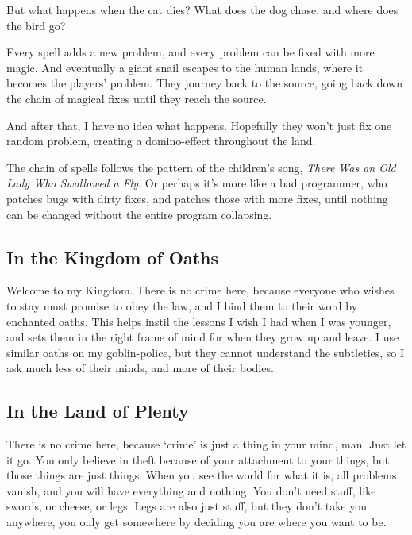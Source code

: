 But what happens when the cat dies?
What does the dog chase, and where does the bird go?

Every spell adds a new problem, and every problem can be fixed with more magic.
And eventually a giant snail escapes to the human lands, where it becomes the players' problem.
They journey back to the source, going back down the chain of magical fixes until they reach the source.

And after that, I have no idea what happens.
Hopefully they won't just fix one random problem, creating a domino-effect throughout the land.

The chain of spells follows the pattern of the children's song, \textit{There Was an Old Lady Who Swallowed a Fly}.
Or perhaps it's more like a bad programmer, who patches bugs with dirty fixes, and patches those with more fixes, until nothing can be changed without the entire program collapsing.

\subsection{In the Kingdom of Oaths}

\begin{exampletext}
  Welcome to my Kingdom.
  There is no crime here, because everyone who wishes to stay must promise to obey the law, and I bind them to their word by enchanted oaths.
  This helps instil the lessons I wish I had when I was younger, and sets them in the right frame of mind for when they grow up and leave.
  I use similar oaths on my goblin-police, but they cannot understand the subtleties, so I ask much less of their minds, and more of their bodies.

\end{exampletext}

\subsection{In the Land of Plenty}

\begin{exampletext}
  There is no crime here, because `crime' is just a thing in your mind, man.
  Just let it go.
  You only believe in theft because of your attachment to your things, but those things are just things.
  When you see the world for what it is, all problems vanish, and you will have everything and nothing.
  You don't need stuff, like swords, or cheese, or legs.
  Legs are also just stuff, but they don't take you anywhere, you only get somewhere by deciding you are where you want to be.
\end{exampletext}


